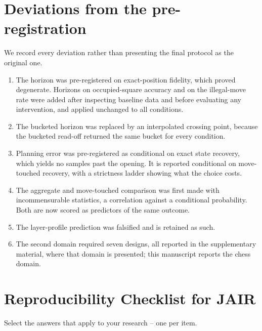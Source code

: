 \documentclass[manuscript, screen, review]{jair}
\theoremstyle{remark}
\begin{document}
\section{Deviations from the pre-registration}
\label{app:deviations}

We record every deviation rather than presenting the final protocol as the
original one.

\begin{enumerate}[nosep]
\item The horizon was pre-registered on exact-position fidelity, which proved
degenerate. Horizons on occupied-square accuracy and on the illegal-move rate
were added after inspecting baseline data and before evaluating any intervention,
and applied unchanged to all conditions.
\item The bucketed horizon was replaced by an interpolated crossing point,
because the bucketed read-off returned the same bucket for every condition.
\item Planning error was pre-registered as conditional on exact state recovery,
which yields no samples past the opening. It is reported conditional on
move-touched recovery, with a strictness ladder showing what the choice costs.
\item The aggregate and move-touched comparison was first made with
incommensurable statistics, a correlation against a conditional probability. Both
are now scored as predictors of the same outcome.
\item The layer-profile prediction was falsified and is retained as such.
\item The second domain required seven designs, all reported in the supplementary
material, where that domain is presented; this manuscript reports the chess
domain.
\end{enumerate}

\printbibliography


\appendix

\section{Reproducibility Checklist for JAIR}

Select the answers that apply to your research -- one per item.
\end{document}
